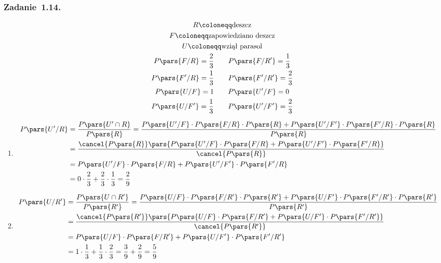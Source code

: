 \subsubsection*{Zadanie~1.14.}
\begin{gather*}
    R \coloneqq \text{deszcz}\\
    F \coloneqq \text{zapowiedziano deszcz}\\
    U \coloneqq \text{wziął parasol}\\
    P\pars{F / R} = \frac{2}{3} \qquad P\pars{F / R'} = \frac{1}{3}\\
    P\pars{F' / R} = \frac{1}{3} \qquad P\pars{F' / R'} = \frac{2}{3}\\
    P\pars{U / F} = 1 \qquad P\pars{U' / F} = 0\\
    P\pars{U / F'} = \frac{1}{3} \qquad P\pars{U' / F'} = \frac{2}{3}\\
\end{gather*}
\begin{enumerate}[label={(\roman*)}]
    \item
        \begin{equation*}
            \begin{split}
                P\pars{U' / R}
                &= \frac{P\pars{U' \cap R}}{P\pars{R}}
                = \frac{P\pars{U' / F} \cdot P\pars{F / R} \cdot P\pars{R} + P\pars{U' / F'} \cdot P\pars{F' / R} \cdot P\pars{R}}{P\pars{R}}\\
                &= \frac{\cancel{P\pars{R}}\pars{P\pars{U' / F} \cdot P\pars{F / R} + P\pars{U' / F'} \cdot P\pars{F' / R}}}{\cancel{P\pars{R}}}\\
                &= P\pars{U' / F} \cdot P\pars{F / R} + P\pars{U' / F'} \cdot P\pars{F' / R}\\
                &= 0 \cdot \frac{2}{3} + \frac{2}{3} \cdot \frac{1}{3} = \frac{2}{9}
            \end{split}
        \end{equation*}
    \item
        \begin{equation*}
            \begin{split}
                P\pars{U / R'}
                &= \frac{P\pars{U \cap R'}}{P\pars{R'}}
                = \frac{P\pars{U / F} \cdot P\pars{F / R'} \cdot P\pars{R'} + P\pars{U / F'} \cdot P\pars{F' / R'} \cdot P\pars{R'}}{P\pars{R'}}\\
                &= \frac{\cancel{P\pars{R'}}\pars{P\pars{U / F} \cdot P\pars{F / R'} + P\pars{U / F'} \cdot P\pars{F' / R'}}}{\cancel{P\pars{R'}}}\\
                &= P\pars{U / F} \cdot P\pars{F / R'} + P\pars{U / F'} \cdot P\pars{F' / R'}\\
                &= 1 \cdot \frac{1}{3} + \frac{1}{3} \cdot \frac{2}{3}
                = \frac{3}{9} + \frac{2}{9}
                = \frac{5}{9}
            \end{split}
        \end{equation*}
\end{enumerate}
